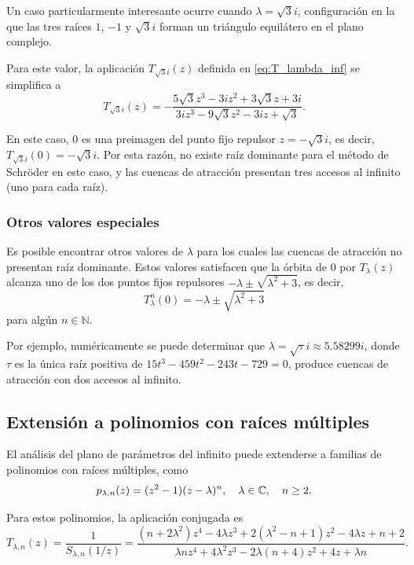 Un caso particularmente interesante ocurre cuando $\lambda=\sqrt{3}i$, configuración en la que las tres raíces $1$, $-1$ y $\sqrt{3}i$ forman un triángulo equilátero en el plano complejo.

Para este valor, la aplicación $T_{\sqrt{3}i}(z)$ definida en \eqref{eq:T_lambda_inf} se simplifica a
$$
T_{\sqrt{3}i}(z)=-\frac{5\sqrt{3}z^3-3iz^2+3\sqrt{3}z+3i}{3iz^3-9\sqrt{3}z^2-3iz+\sqrt{3}}.
$$

En este caso, $0$ es una preimagen del punto fijo repulsor $z=-\sqrt{3}i$, es decir, $T_{\sqrt{3}i}(0)=-\sqrt{3}i$. Por esta razón, no existe raíz dominante para el método de Schröder en este caso, y las cuencas de atracción presentan tres accesos al infinito (uno para cada raíz).

\subsubsection{Otros valores especiales}

Es posible encontrar otros valores de $\lambda$ para los cuales las cuencas de atracción no presentan raíz dominante. Estos valores satisfacen que la órbita de $0$ por $T_\lambda(z)$ alcanza uno de los dos puntos fijos repulsores $-\lambda\pm\sqrt{\lambda^2+3}$, es decir,
$$
T^n_\lambda(0)=-\lambda\pm\sqrt{\lambda^2+3}
$$
para algún $n\in\mathbb{N}$.

Por ejemplo, numéricamente se puede determinar que $\lambda=\sqrt{\tau}i\approx 5.58299i$, donde $\tau$ es la única raíz positiva de $15t^3-459t^2-243t-729=0$, produce cuencas de atracción con dos accesos al infinito.

\subsection{Extensión a polinomios con raíces múltiples}

El análisis del plano de parámetros del infinito puede extenderse a familias de polinomios con raíces múltiples, como
\begin{equation}
p_{\lambda,n}(z)=(z^2-1)(z-\lambda)^n, \quad \lambda\in\mathbb{C}, \quad n\ge 2.
\label{eq:familia_mult_inf}
\end{equation}

Para estos polinomios, la aplicación conjugada es
\begin{equation}
T_{\lambda,n}(z)=\frac{1}{S_{\lambda,n}(1/z)}=\frac{(n+2\lambda^2)z^4-4\lambda z^3+2(\lambda^2-n+1)z^2-4\lambda z+n+2}{\lambda n z^4+4\lambda^2 z^3-2\lambda(n+4)z^2+4z+\lambda n}.
\label{eq:T_lambda_n_inf}
\end{equation}


